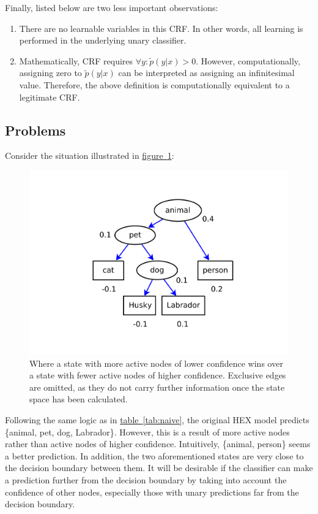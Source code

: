 \documentclass[11pt,a4paper]{article}
\begin{document}
Finally, listed below are two less important observations:
\begin{enumerate}
\item There are no learnable variables in this CRF. In other words, all learning is performed in the underlying unary classifier.
\item Mathematically, CRF requires $\forall y:\tilde{p}(y|x)>0$. However, computationally, assigning zero to $\tilde{p}(y|x)$ can be interpreted as assigning an infinitesimal value. Therefore, the above definition is computationally equivalent to a legitimate CRF.
\end{enumerate}

\subsection{Problems}
\label{sec:problem}

Consider the situation illustrated in \hyperref[fig:depth]{figure~\ref{fig:depth}}:
\begin{figure}[htbp]
\centering\includegraphics[scale=0.5]{depth.pdf}
\caption{Where a state with more active nodes of lower confidence wins over a state with fewer active nodes of higher confidence. Exclusive edges are omitted, as they do not carry further information once the state space has been calculated.}
\label{fig:depth}
\end{figure}

Following the same logic as in \hyperref[tab:naive]{table~\ref{tab:naive}}, the original HEX model predicts \{animal, pet, dog, Labrador\}. However, this is a result of more active nodes rather than active nodes of higher confidence. Intuitively, \{animal, person\} seems a better prediction. In addition, the two aforementioned states are very close to the decision boundary between them. It will be desirable if the classifier can make a prediction further from the decision boundary by taking into account the confidence of other nodes, especially those with unary predictions far from the decision boundary.
\end{document}
